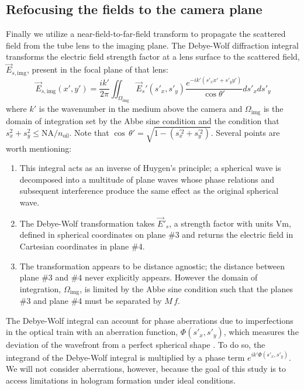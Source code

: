 \subsection{Refocusing the fields to the camera plane}
Finally we utilize a near-field-to-far-field transform to propagate the scattered
field from the tube lens to the imaging plane.
The Debye-Wolf diffraction integral transforms the electric field strength factor at a lens
surface to the scattered field, $\vec{E}_{s,\text{img}}$, present in the focal plane of that
lens:
\begin{equation}
  \vec{E}_{s,\text{img}}(x', y') = \frac{i k'}{2 \pi} \iint_{\Omega_{\text{img}}} \vec{E}_s'(s'_x, s'_y) \frac{e^{-ik'(s'_xx'+s'_yy')}}{\cos{\theta'}}ds'_xds'_y 
  \label{eq:debyewolf}
\end{equation}
where $k'$ is the wavenumber in the medium above the camera and $\Omega_{\text{img}}$
is the domain of integration set by the Abbe sine condition and the condition
that $s_x^2+s_y^2 \le \text{NA}/n_{\text{oil}}$. Note that $\cos \, \theta' = \sqrt{ 1 - (s_x^{\prime 2} + s_y^{\prime 2} )}$. Several points are worth mentioning:
\begin{enumerate}
\item This integral acts as an inverse of Huygen's principle; a spherical wave is
  decomposed into a multitude of plane waves whose phase relations and subsequent
  interference produce the same effect as the original spherical wave.
\item The Debye-Wolf transformation takes $\vec{E}'_s$, a strength factor with units
  $\si{\volt\meter}$, defined in spherical coordinates on plane \#\num{3} and
  returns the electric field in Cartesian coordinates in plane \#\num{4}.
\item The transformation appears to be distance agnostic; the distance
  between plane \#\num{3} and \#\num{4} never explicitly appears. However the domain
  of integration, $\Omega_{\text{img}}$, is limited by the Abbe sine condition
  such that the planes \#\num{3} and plane \#\num{4} must be separated by $M \, f$.
\end{enumerate}

The Debye-Wolf integral can account for phase aberrations
due to imperfections in the optical train with an aberration function, $\Phi(s'_x,s'_y)$,
which measures the deviation of the wavefront from a perfect spherical shape \cite{wolf1959}.
To do so, the integrand of the Debye-Wolf integral is multiplied by a phase term
$e^{ik'\Phi(s'_x,s'_y)}$. We will not consider aberrations, however, because
the goal of this study is to access limitations in hologram formation
under ideal conditions.

